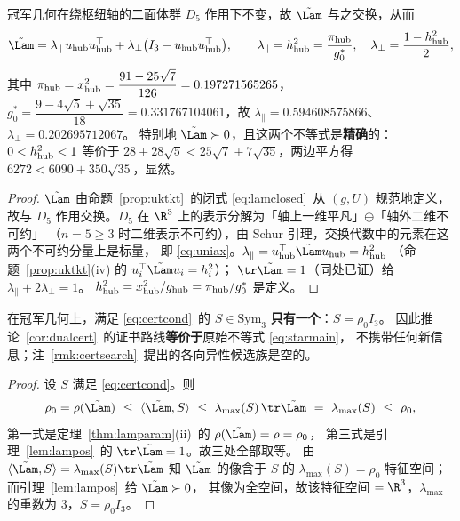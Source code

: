 \begin{lemma}\label{lem:lampos}
冠军几何在绕枢纽轴的二面体群 $D_5$ 作用下不变，故 $\tilde\Lam$ 与之交换，从而
\begin{equation}\label{eq:uniax}
\tilde\Lam=\lambda_\parallel\,u_{\rm hub}u_{\rm hub}^\top+\lambda_\perp\bigl(I_3-u_{\rm hub}u_{\rm hub}^\top\bigr),
\qquad
\lambda_\parallel=h_{\rm hub}^2=\frac{\pi_{\rm hub}}{g_0^*},\quad
\lambda_\perp=\frac{1-h_{\rm hub}^2}{2},
\end{equation}
其中 $\pi_{\rm hub}=x_{\rm hub}^2=\dfrac{91-25\sqrt7}{126}=0.197271565265$，
$g_0^*=\dfrac{9-4\sqrt5+\sqrt{35}}{18}=0.331767104061$，故
$\lambda_\parallel=0.594608575866$、$\lambda_\perp=0.202695712067$。
特别地 $\tilde\Lam\succ0$，且这两个不等式是\textbf{精确}的：
$0<h_{\rm hub}^2<1$ 等价于 $28+28\sqrt5<25\sqrt7+7\sqrt{35}$，两边平方得 $6272<6090+350\sqrt{35}$，显然。
\end{lemma}

\begin{proof}
$\tilde\Lam$ 由命题~\ref{prop:uktkt}~的闭式 \eqref{eq:lamclosed}~从 $(g,U)$ 规范地定义，
故与 $D_5$ 作用交换。$D_5$ 在 $\R^3$ 上的表示分解为「轴上一维平凡」$\oplus$「轴外二维不可约」
（$n=5\ge3$ 时二维表示不可约），由 Schur 引理，交换代数中的元素在这两个不可约分量上是标量，
即 \eqref{eq:uniax}。$\lambda_\parallel=u_{\rm hub}^\top\tilde\Lam u_{\rm hub}=h_{\rm hub}^2$
（命题~\ref{prop:uktkt}(iv) 的 $u_i^\top\tilde\Lam u_i=h_i^2$）；
$\tr\tilde\Lam=1$（同处已证）给 $\lambda_\parallel+2\lambda_\perp=1$。
$h_{\rm hub}^2=x_{\rm hub}^2/g_{\rm hub}=\pi_{\rm hub}/g_0^*$ 是定义。
\end{proof}

\begin{proposition}[各向异性证书不存在]\label{prop:P1dead}
在冠军几何上，满足 \eqref{eq:certcond}~的 $S\in\mathrm{Sym}_3$ \textbf{只有一个}：$S=\rho_0I_3$。
因此推论~\ref{cor:dualcert}~的证书路线\textbf{等价于}原始不等式 \eqref{eq:starmain}，
不携带任何新信息；注~\ref{rmk:certsearch}~提出的各向异性候选族是空的。
\end{proposition}

\begin{proof}
设 $S$ 满足 \eqref{eq:certcond}。则
\[
\rho_0=\rho(\tilde\Lam)\ \le\ \langle\tilde\Lam,S\rangle\ \le\ \lambda_{\max}(S)\,\tr\tilde\Lam
\ =\ \lambda_{\max}(S)\ \le\ \rho_0 ,
\]
第一式是定理~\ref{thm:lamparam}(ii)~的 $\rho(\tilde\Lam)=\rho=\rho_0$，
第三式是引理~\ref{lem:lampos}~的 $\tr\tilde\Lam=1$。故三处全部取等。
由 $\langle\tilde\Lam,S\rangle=\lambda_{\max}(S)\tr\tilde\Lam$ 知 $\tilde\Lam$ 的像含于 $S$ 的
$\lambda_{\max}(S)=\rho_0$ 特征空间；而引理~\ref{lem:lampos}~给 $\tilde\Lam\succ0$，
其像为全空间，故该特征空间 $=\R^3$，$\lambda_{\max}$ 的重数为 $3$，$S=\rho_0I_3$。
\end{proof}

